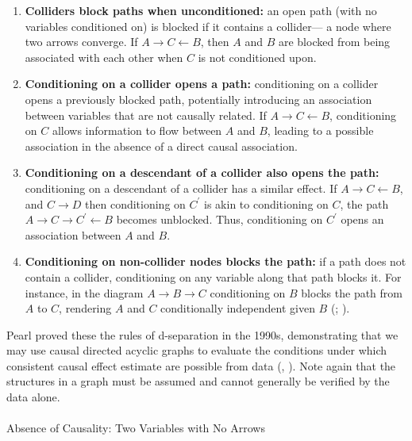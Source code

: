 \documentclass[
  singlecolumn]{article}
\makeatletter
\let\oldparagraph\paragraph
\renewcommand{\paragraph}{
    \@ifstar
      \xxxParagraphStar
      \xxxParagraphNoStar
  }
\newcommand{\xxxParagraphStar}[1]{\oldparagraph*{#1}\mbox{}}
\newcommand{\xxxParagraphNoStar}[1]{\oldparagraph{#1}\mbox{}}
\providecommand{\tightlist}{%
  \setlength{\itemsep}{0pt}\setlength{\parskip}{0pt}}\usepackage{longtable,booktabs,array}
\makeatother
\begin{document}
\begin{enumerate}
\def\labelenumi{\arabic{enumi}.}
\tightlist
\item
  \textbf{Colliders block paths when unconditioned:} an open path (with
  no variables conditioned on) is blocked if it contains a collider--- a
  node where two arrows converge. If
  \(A \rightarrow \boxed{C} \leftarrow B\), then \(A\) and \(B\) are
  blocked from being associated with each other when \(C\) is not
  conditioned upon.
\item
  \textbf{Conditioning on a collider opens a path:} conditioning on a
  collider opens a previously blocked path, potentially introducing an
  association between variables that are not causally related. If
  \(A \rightarrow \boxed{C} \leftarrow B\), conditioning on \(C\) allows
  information to flow between \(A\) and \(B\), leading to a possible
  association in the absence of a direct causal association.
\item
  \textbf{Conditioning on a descendant of a collider also opens the
  path:} conditioning on a descendant of a collider has a similar
  effect. If \(A \rightarrow \boxed{C} \leftarrow B\), and \(C \to D\)
  then conditioning on \(C^{\prime}\) is akin to conditioning on \(C\),
  the path \(A \rightarrow C \rightarrow \boxed{C^\prime} \leftarrow B\)
  becomes unblocked. Thus, conditioning on \(C^\prime\) opens an
  association between \(A\) and \(B\).
\item
  \textbf{Conditioning on non-collider nodes blocks the path:} if a path
  does not contain a collider, conditioning on any variable along that
  path blocks it. For instance, in the diagram
  \(A \rightarrow \boxed{B} \rightarrow C\) conditioning on \(B\) blocks
  the path from \(A\) to \(C\), rendering \(A\) and \(C\) conditionally
  independent given \(B\) (; ).
\end{enumerate}

Pearl proved these the rules of d-separation in the 1990s, demonstrating
that we may use causal directed acyclic graphs to evaluate the
conditions under which consistent causal effect estimate are possible
from data (,
). Note again that the structures in a
graph must be assumed and cannot generally be verified by the data
alone.

\paragraph{Absence of Causality: Two Variables with No
Arrows}\label{absence-of-causality-two-variables-with-no-arrows}
\end{document}
